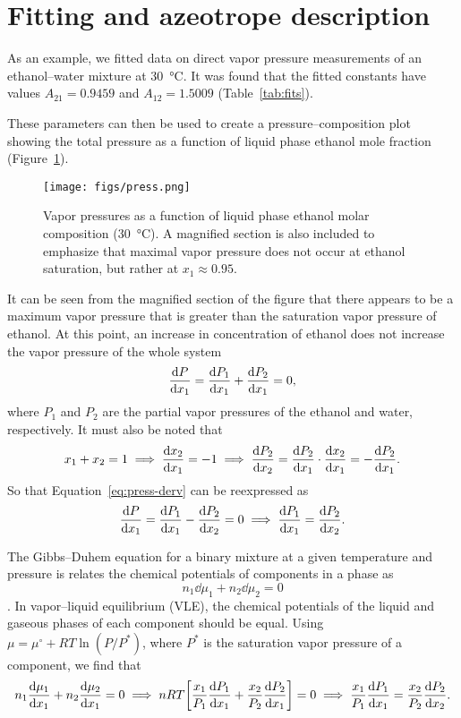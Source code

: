 \section{Fitting and azeotrope description}

As an example, we fitted data on direct vapor pressure measurements of
an ethanol--water mixture at \SI{30}{\celsius}. It was found that the
fitted constants have values $A_{21}=0.9459$ and $A_{12}=1.5009$
(Table~\ref{tab:fits}).

These parameters can then be used to create a pressure--composition plot
showing the total pressure as a function of liquid phase ethanol mole 
fraction (Figure~\ref{fig:press-plot}).

\begin{figure}[ht]
    \centering
    \texttt{[image: figs/press.png]}
    \caption{Vapor pressures as a function of liquid phase ethanol molar composition
    (\SI{30}{\celsius}).
    A magnified section is also included to emphasize that maximal vapor pressure
    does not occur at ethanol saturation, but rather at $x_1\approx 0.95$.}
    \label{fig:press-plot}
\end{figure}

It can be seen from the magnified section of the figure that there appears to
be a maximum vapor pressure that is greater than the saturation vapor pressure
of ethanol. At this point, an increase in concentration of ethanol does not
increase the vapor pressure of the whole system
\begin{equation}\label{eq:press-derv}
    \dv{P}{x_1} = \dv{P_1}{x_1} + \dv{P_2}{x_1} = 0,
\end{equation}
where $P_1$ and $P_2$ are the partial vapor pressures of the ethanol and
water, respectively. It must also be noted that 
\[
    x_1 + x_2 = 1 \implies \dv{x_2}{x_1} = -1 
    \implies \dv{P_2}{x_2} = \dv{P_2}{x_1} \cdot \dv{x_2}{x_1} =
    -\dv{P_2}{x_1}.
\]
So that Equation~\ref{eq:press-derv} can be reexpressed as
\begin{equation}\label{eq:press-derv2}
    \dv{P}{x_1} = \dv{P_1}{x_1} - \dv{P_2}{x_2} = 0 \implies
    \dv{P_1}{x_1} = \dv{P_2}{x_2}.
\end{equation}

The Gibbs--Duhem equation for a binary mixture at a given temperature and
pressure is relates the chemical potentials of components in a phase as
\begin{equation}\label{eq:gibbs-duhem}
    n_1\dd{\mu_1} + n_2 \dd{\mu_2} = 0
\end{equation}
\cite[p.~439]{enggbook}.
In vapor--liquid equilibrium (VLE), the chemical potentials of the liquid
and gaseous phases of each component should be equal. Using $\mu = \mu^\circ
+ RT \ln(P/P^*)$, where $P^*$ is the saturation vapor pressure of a
component, we find that
\begin{equation}\label{eq:gibbs-duhem2}
    n_1 \dv{\mu_1}{x_1} + n_2 \dv{\mu_2}{x_1} = 0 \implies
    nRT \qty[ \dfrac{x_1}{P_1} \dv{P_1}{x_1} + \dfrac{x_2}{P_2} \dv{P_2}{x_1} ] = 0
    \implies \dfrac{x_1}{P_1} \dv{P_1}{x_1} = \dfrac{x_2}{P_2} \dv{P_2}{x_2}.
\end{equation}

